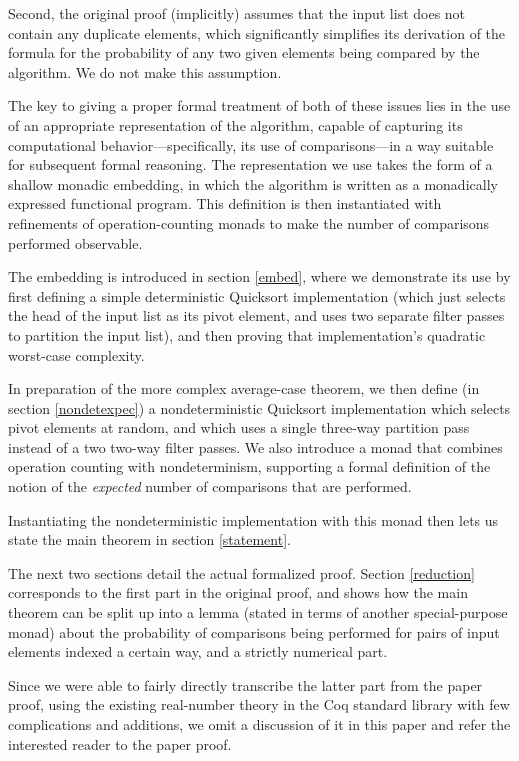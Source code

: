 \documentclass[runningheads]{llncs}
\begin{document}
Second, the original proof (implicitly) assumes that the input list does not contain any duplicate elements, which significantly simplifies its derivation of the formula for the probability of any two given elements being compared by the algorithm. We do not make this assumption.

The key to giving a proper formal treatment of both of these issues lies in the use of an appropriate representation of the algorithm, capable of capturing its computational behavior---specifically, its use of comparisons---in a way suitable for subsequent formal reasoning. The representation we use takes the form of a shallow monadic embedding, in which the algorithm is written as a monadically expressed functional program. This definition is then instantiated with refinements of operation-counting monads to make the number of comparisons performed observable.

The embedding is introduced in section \ref{embed}, where we demonstrate its use by first defining a simple deterministic Quicksort implementation (which just selects the head of the input list as its pivot element, and uses two separate filter passes to partition the input list), and then proving that implementation's quadratic worst-case complexity.

In preparation of the more complex average-case theorem, we then define (in section \ref{nondetexpec}) a nondeterministic Quicksort implementation which selects pivot elements at random, and which uses a single three-way partition pass instead of a two two-way filter passes. We also introduce a monad that combines operation counting with nondeterminism, supporting a formal definition of the notion of the \emph{expected} number of comparisons that are performed.

Instantiating the nondeterministic implementation with this monad then lets us state the main theorem in section \ref{statement}.

The next two sections detail the actual formalized proof. Section \ref{reduction} corresponds to the first part in the original proof, and shows how the main theorem can be split up into a lemma (stated in terms of another special-purpose monad) about the probability of comparisons being performed for pairs of input elements indexed a certain way, and a strictly numerical part.

Since we were able to fairly directly transcribe the latter part from the paper proof, using the existing real-number theory in the Coq standard library with few complications and additions, we omit a discussion of it in this paper and refer the interested reader to the paper proof.
\end{document}

